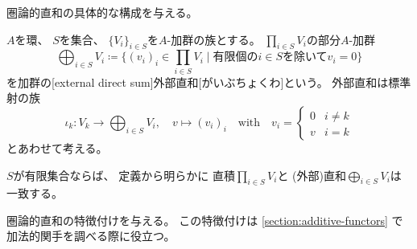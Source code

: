 \documentclass[report]{jlreq}
\begin{document}
圏論的直和の具体的な構成を与える。

\begin{definition}[外部直和]
    $A$を環、
    $S$を集合、
    $\{ V_i \}_{i \in S}$を$A$-加群の族とする。
    $\prod_{i \in S} V_i$の部分$A$-加群
    \begin{equation}
        \bigoplus_{i \in S} V_i
            \coloneqq \biggl\{
                (v_i)_i \in \prod_{i \in S} V_i
                \; \bigg| \;
                \text{有限個の$i \in S$を除いて$v_i = 0$}
            \biggr\}
    \end{equation}
    を加群の[external direct sum]{外部直和}[がいぶちょくわ]という。
    外部直和は標準射の族
    \begin{equation}
        \iota_k \colon V_k \to \bigoplus_{i \in S} V_i,
        \quad
        v \mapsto (v_i)_i
        \quad \text{with} \quad
        v_i = \begin{cases}
            0 & i \neq k \\
            v & i = k
        \end{cases}
    \end{equation}
    とあわせて考える。
\end{definition}

\begin{remark}
    $S$が有限集合ならば、
    定義から明らかに
    直積$\prod_{i \in S} V_i$と
    (外部)直和$\bigoplus_{i \in S} V_i$は一致する。
\end{remark}

\begin{definition}[内部直和]
    \TODO{}
\end{definition}

圏論的直和の特徴付けを与える。
この特徴付けは
\cref{section:additive-functors}
で加法的関手を調べる際に役立つ。
\end{document}
